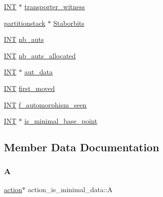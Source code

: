 \begin{DoxyCompactItemize}
\mbox{\hyperlink{galois_8h_a09fddde158a3a20bd2dcadb609de11dc}{I\+NT}} $\ast$ \mbox{\hyperlink{structaction__is__minimal__data_a35b3469f2e67af9ff473a4eb45a430bd}{transporter\+\_\+witness}}
\item 
\mbox{\hyperlink{classpartitionstack}{partitionstack}} $\ast$ \mbox{\hyperlink{structaction__is__minimal__data_ad50c959c50a5644815c9d438157568bd}{Staborbits}}
\item 
\mbox{\hyperlink{galois_8h_a09fddde158a3a20bd2dcadb609de11dc}{I\+NT}} \mbox{\hyperlink{structaction__is__minimal__data_a1e6a9760e6f1323b9fabb37cc208198c}{nb\+\_\+auts}}
\item 
\mbox{\hyperlink{galois_8h_a09fddde158a3a20bd2dcadb609de11dc}{I\+NT}} \mbox{\hyperlink{structaction__is__minimal__data_a92274bcaee579f99055d27ab218ea02c}{nb\+\_\+auts\+\_\+allocated}}
\item 
\mbox{\hyperlink{galois_8h_a09fddde158a3a20bd2dcadb609de11dc}{I\+NT}} $\ast$ \mbox{\hyperlink{structaction__is__minimal__data_ac6ace338a7614072e858273e68b2f3c0}{aut\+\_\+data}}
\item 
\mbox{\hyperlink{galois_8h_a09fddde158a3a20bd2dcadb609de11dc}{I\+NT}} \mbox{\hyperlink{structaction__is__minimal__data_a848aca2f312e680d0e8b368ee6be9e8a}{first\+\_\+moved}}
\item 
\mbox{\hyperlink{galois_8h_a09fddde158a3a20bd2dcadb609de11dc}{I\+NT}} \mbox{\hyperlink{structaction__is__minimal__data_a66cd9d215000c41f36462d9bbdd4619b}{f\+\_\+automorphism\+\_\+seen}}
\item 
\mbox{\hyperlink{galois_8h_a09fddde158a3a20bd2dcadb609de11dc}{I\+NT}} $\ast$ \mbox{\hyperlink{structaction__is__minimal__data_a8d06a572746440a9eac0c74f9c46bdd4}{is\+\_\+minimal\+\_\+base\+\_\+point}}
\end{DoxyCompactItemize}


\subsection{Member Data Documentation}
\mbox{\label{structaction__is__minimal__data_a3336fd04c5af26ca5fcab84fc69bab2e}} 
\subsubsection{\texorpdfstring{A}{A}}
{\footnotesize\ttfamily \mbox{\hyperlink{classaction}{action}}$\ast$ action\+\_\+is\+\_\+minimal\+\_\+data\+::A}

